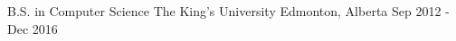 
\begin{cventries}
  \cventry
    {B.S. in Computer Science} %
    {The King's University} %
    {Edmonton, Alberta} %
    {Sep 2012 - Dec 2016} %
    {}
    
\end{cventries}